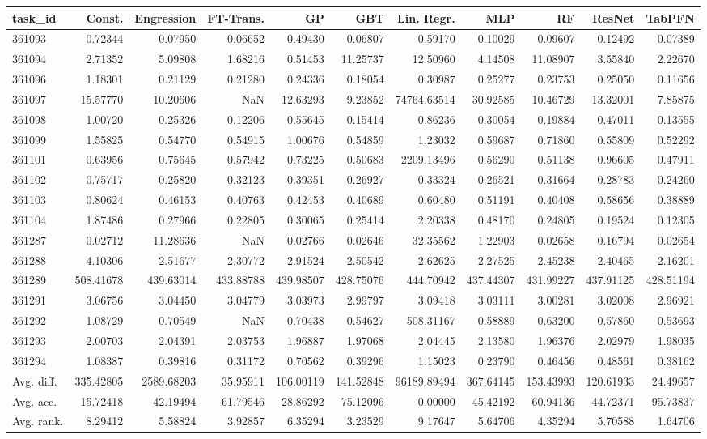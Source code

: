 \begin{tabular}{lrrrrrrrrrr}
\toprule
task\_id & Const. & Engression & FT-Trans. & GP & GBT & Lin. Regr. & MLP & RF & ResNet & TabPFN \\
\midrule
361093 & 0.72344 & 0.07950 & 0.06652 & 0.49430 & 0.06807 & 0.59170 & 0.10029 & 0.09607 & 0.12492 & 0.07389 \\
361094 & 2.71352 & 5.09808 & 1.68216 & 0.51453 & 11.25737 & 12.50960 & 4.14508 & 11.08907 & 3.55840 & 2.22670 \\
361096 & 1.18301 & 0.21129 & 0.21280 & 0.24336 & 0.18054 & 0.30987 & 0.25277 & 0.23753 & 0.25050 & 0.11656 \\
361097 & 15.57770 & 10.20606 & NaN & 12.63293 & 9.23852 & 74764.63514 & 30.92585 & 10.46729 & 13.32001 & 7.85875 \\
361098 & 1.00720 & 0.25326 & 0.12206 & 0.55645 & 0.15414 & 0.86236 & 0.30054 & 0.19884 & 0.47011 & 0.13555 \\
361099 & 1.55825 & 0.54770 & 0.54915 & 1.00676 & 0.54859 & 1.23032 & 0.59687 & 0.71860 & 0.55809 & 0.52292 \\
361101 & 0.63956 & 0.75645 & 0.57942 & 0.73225 & 0.50683 & 2209.13496 & 0.56290 & 0.51138 & 0.96605 & 0.47911 \\
361102 & 0.75717 & 0.25820 & 0.32123 & 0.39351 & 0.26927 & 0.33324 & 0.26521 & 0.31664 & 0.28783 & 0.24260 \\
361103 & 0.80624 & 0.46153 & 0.40763 & 0.42453 & 0.40689 & 0.60480 & 0.51191 & 0.40408 & 0.58656 & 0.38889 \\
361104 & 1.87486 & 0.27966 & 0.22805 & 0.30065 & 0.25414 & 2.20338 & 0.48170 & 0.24805 & 0.19524 & 0.12305 \\
361287 & 0.02712 & 11.28636 & NaN & 0.02766 & 0.02646 & 32.35562 & 1.22903 & 0.02658 & 0.16794 & 0.02654 \\
361288 & 4.10306 & 2.51677 & 2.30772 & 2.91524 & 2.50542 & 2.62625 & 2.27525 & 2.45238 & 2.40465 & 2.16201 \\
361289 & 508.41678 & 439.63014 & 433.88788 & 439.98507 & 428.75076 & 444.70942 & 437.44307 & 431.99227 & 437.91125 & 428.51194 \\
361291 & 3.06756 & 3.04450 & 3.04779 & 3.03973 & 2.99797 & 3.09418 & 3.03111 & 3.00281 & 3.02008 & 2.96921 \\
361292 & 1.08729 & 0.70549 & NaN & 0.70438 & 0.54627 & 508.31167 & 0.58889 & 0.63200 & 0.57860 & 0.53693 \\
361293 & 2.00703 & 2.04391 & 2.03753 & 1.96887 & 1.97068 & 2.04445 & 2.13580 & 1.96376 & 2.02979 & 1.98035 \\
361294 & 1.08387 & 0.39816 & 0.31172 & 0.70562 & 0.39296 & 1.15023 & 0.23790 & 0.46456 & 0.48561 & 0.38162 \\
Avg. diff. & 335.42805 & 2589.68203 & 35.95911 & 106.00119 & 141.52848 & 96189.89494 & 367.64145 & 153.43993 & 120.61933 & 24.49657 \\
Avg. acc. & 15.72418 & 42.19494 & 61.79546 & 28.86292 & 75.12096 & 0.00000 & 45.42192 & 60.94136 & 44.72371 & 95.73837 \\
Avg. rank. & 8.29412 & 5.58824 & 3.92857 & 6.35294 & 3.23529 & 9.17647 & 5.64706 & 4.35294 & 5.70588 & 1.64706 \\
\bottomrule
\end{tabular}
